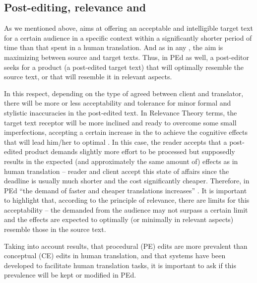 \documentclass[output=paper]{langsci/langscibook}
\begin{document}
\subsection{Post-editing, relevance and \label{alves:sec:PosteditingRelevanceAndEncoding}}

As we mentioned above,  aims at offering an acceptable and intelligible target text for a certain audience in a specific context within a significantly shorter period of time than that spent in a human translation. And as in any , the aim is maximizing  between source and target texts. Thus, in PEd as well, a post-editor seeks for a product (a post-edited target text) that will optimally resemble the source text, or that will resemble it in relevant aspects. 


In this respect, depending on the type of  agreed between client and translator, there will be more or less acceptability and tolerance for minor formal and stylistic inaccuracies in the post-edited text. In Relevance Theory terms, the target text receptor will be more inclined and ready to overcome some small imperfections, accepting a certain increase in the  to achieve the cognitive effects that will lead him/her to optimal . In this case, the reader accepts that a post-edited product demands slightly more effort to be processed but supposedly results in the expected (and approximately the same amount of) effects as in human translation -- reader and client accept this state of affairs since the deadline is usually much shorter and the cost significantly cheaper. Therefore, in PEd ``the demand of faster and cheaper translations increases'' \citep[171]{aziz2014}. It is important to highlight that, according to the principle of relevance, there are limits for this acceptability -- the  demanded from the audience may not surpass a certain limit and the effects are expected to optimally (or minimally in relevant aspects) resemble those in the source text.



Taking into account \citet{alves2013} results, that procedural  (PE) edits are more prevalent than conceptual  (CE) edits in human translation, and that  systems have been developed to facilitate human translation tasks, it is important to ask if this prevalence will be kept or modified in PEd.
\end{document}
